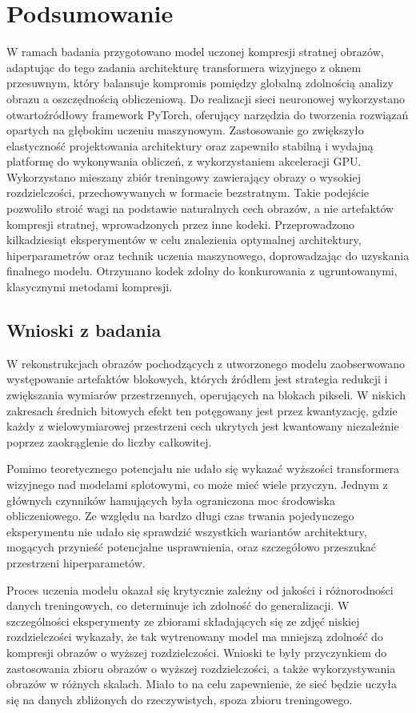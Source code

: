 \clearpage
\section{Podsumowanie}
W ramach badania przygotowano model uczonej kompresji stratnej obrazów, adaptując do tego zadania architekturę transformera wizyjnego z oknem przesuwnym, który balansuje kompromis pomiędzy globalną zdolnością analizy obrazu a oszczędnością obliczeniową. Do realizacji sieci neuronowej wykorzystano otwartoźródłowy framework PyTorch, oferujący narzędzia do tworzenia rozwiązań opartych na głębokim uczeniu maszynowym. Zastosowanie go zwiększyło elastyczność projektowania architektury oraz zapewniło stabilną i wydajną platformę do wykonywania obliczeń, z wykorzystaniem akceleracji GPU. Wykorzystano mieszany zbiór treningowy zawierający obrazy o wysokiej rozdzielczości, przechowywanych w formacie bezstratnym. Takie podejście pozwoliło stroić wagi na podstawie naturalnych cech obrazów, a nie artefaktów kompresji stratnej, wprowadzonych przez inne kodeki. Przeprowadzono kilkadziesiąt eksperymentów w celu znalezienia optymalnej architektury, hiperparametrów oraz technik uczenia maszynowego, doprowadzając do uzyskania finalnego modelu. Otrzymano kodek zdolny do konkurowania z ugruntowanymi, klasycznymi metodami kompresji.
\subsection{Wnioski z badania}
W rekonstrukcjach obrazów pochodzących z utworzonego modelu zaobserwowano występowanie artefaktów blokowych, których źródłem jest strategia redukcji i zwiększania wymiarów przestrzennych, operujących na blokach pikseli. W niskich zakresach średnich bitowych efekt ten potęgowany jest przez kwantyzację, gdzie każdy z wielowymiarowej przestrzeni cech ukrytych jest kwantowany niezależnie poprzez zaokrąglenie do liczby całkowitej.

Pomimo teoretycznego potencjału nie udało się wykazać wyższości transformera wizyjnego nad modelami splotowymi, co może mieć wiele przyczyn. Jednym z głównych czynników hamujących była ograniczona moc środowiska obliczeniowego. Ze względu na bardzo długi czas trwania pojedynczego eksperymentu nie udało się sprawdzić wszystkich wariantów architektury, mogących przynieść potencjalne usprawnienia, oraz szczegółowo przeszukać przestrzeni hiperparametów.

Proces uczenia modelu okazał się krytycznie zależny od jakości i różnorodności danych treningowych, co determinuje ich zdolność do generalizacji. W szczególności eksperymenty ze zbiorami składających się ze zdjęć niskiej rozdzielczości wykazały, że tak wytrenowany model ma mniejszą zdolność do kompresji obrazów o wyższej rozdzielczości. Wnioski te były przyczynkiem do zastosowania zbioru obrazów o wyższej rozdzielczości, a także wykorzystywania obrazów w różnych skalach. Miało to na celu zapewnienie, że sieć będzie uczyła się na danych zbliżonych do rzeczywistych, spoza zbioru treningowego.

